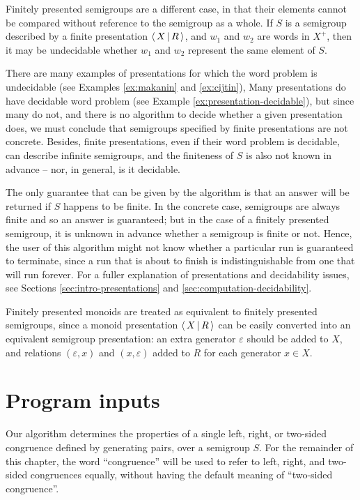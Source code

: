 Finitely presented semigroups are a different case, in that their elements
cannot be compared without reference to the semigroup as a whole.  If $S$ is a
semigroup described by a finite presentation $\left\langle\,X\,\middle|\,R\,\right\rangle$, and $w_1$ and $w_2$
are words in $X^+$, then it may be undecidable whether $w_1$ and $w_2$ represent
the same element of $S$.

There are many examples of presentations for which the word problem is
undecidable (see Examples \ref{ex:makanin} and \ref{ex:cijtin}), Many
presentations do have decidable word problem (see Example
\ref{ex:presentation-decidable}), but since many do not, and there is no algorithm
to decide whether a given presentation does, we must conclude that semigroups
specified by finite presentations are not concrete.  Besides, finite
presentations, even if their word problem is decidable, can describe infinite
semigroups, and the finiteness of $S$ is also not known in advance -- nor, in
general, is it decidable.

The only guarantee that can be given by the algorithm is that an answer will be
returned if $S$ happens to be finite.  In the concrete case, semigroups are
always finite and so an answer is guaranteed; but in the case of a finitely
presented semigroup, it is unknown in advance whether a semigroup is finite or
not.  Hence, the user of this algorithm might not know whether a particular run
is guaranteed to terminate, since a run that is about to finish is
indistinguishable from one that will run forever.  For a fuller explanation of
presentations and decidability issues, see Sections
\ref{sec:intro-presentations} and \ref{sec:computation-decidability}.

Finitely presented monoids are treated as equivalent to finitely presented
semigroups, since a monoid presentation $\left\langle\,X\,\middle|\,R\,\right\rangle$ can be easily converted into
an equivalent semigroup presentation: an extra generator $\varepsilon$ should be
added to $X$, and relations $(\varepsilon,x)$ and $(x,\varepsilon)$ added to $R$
for each generator $x \in X$.

\section{Program inputs}
\label{sec:program-inputs}

Our algorithm determines the properties of a single left, right, or two-sided
congruence defined by generating pairs, over a semigroup $S$.
For the remainder of this chapter, the word ``congruence'' will be used to refer
to left, right, and two-sided congruences equally, without having the default
meaning of ``two-sided congruence''.

